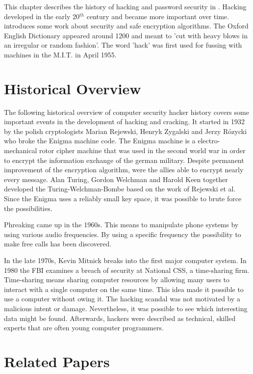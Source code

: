 This chapter describes the history of hacking and password security in . Hacking developed in the early 20$^{th}$ century and became more important over time.  introduces some work about security and safe encryption algorithms. 
The Oxford English Dictionary appeared around 1200 and meant to 'cut with heavy blows in an irregular or random fashion'. The word 'hack' was first used for fussing with machines in the M.I.T. in April 1955. 



\section{Historical Overview}
\label{sec:historicOverview}

The following historical overview of computer security hacker history covers some important events in the development of hacking and cracking. It started in 1932 by the polish cryptologists Marian Rejewski, Henryk Zygalski and Jerzy Rózycki who broke the Enigma machine code. The Enigma machine is a electro-mechanical rotor cipher machine that was used in the second world war in order to encrypt the information exchange of the german military. Despite permanent improvement of the encryption algorithm, were the allies able to encrypt nearly every message. 
Alan Turing, Gordon Welchman and Harold Keen together developed the Turing-Welchman-Bombe based on the work of Rejewski et al. Since the Enigma uses a reliably small key space, it was possible to brute force the possibilities. 

Phreaking came up in the 1960s. This means to manipulate phone systems by using various audio frequencies. By using a specific frequency the possibility to make free calls has been discovered.

In the late 1970s, Kevin Mitnick breaks into the first major computer system. In 1980 the FBI examines a breach of security at National CSS, a time-sharing firm. Time-sharing means sharing computer resources by allowing many users to interact with a single computer on the same time. This idea made it possible to use a computer without owing it. The hacking scandal was not motivated by a malicious intent or damage. Nevertheless, it was possible to see which interesting data might be found. Afterwards, hackers were described as technical, skilled experts that are often young computer programmers. 



\section{Related Papers}
\label{sec:related}

